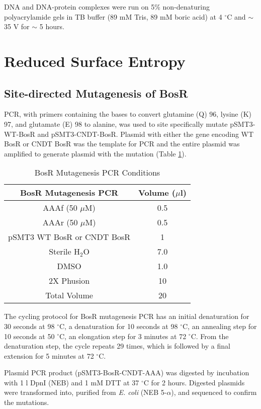 \documentclass[12pt,twoside]{reedthesis}
\begin{document}
DNA and DNA-protein complexes were run on 5\% non-denaturing polyacrylamide gels in TB buffer (89 mM Tris, 89 mM boric acid) at 4 $^\circ$C and $\sim$ 35 V for $\sim$ 5 hours. 

\section{Reduced Surface Entropy}

 \subsection{Site-directed Mutagenesis of BosR}
 PCR, with primers containing the bases to convert glutamine (Q) 96, lysine (K) 97, and glutamate (E) 98 to alanine, was used to site specifically mutate pSMT3-WT-BosR and pSMT3-CNDT-BosR. Plasmid with either the gene encoding WT BosR or CNDT BosR was the template for PCR and the entire plasmid was amplified to generate plasmid with the mutation (Table \ref{BosRmutpcr}). 
\begin{table}[H]
	\caption{BosR Mutagenesis PCR Conditions} 
	\centering
	\label{BosRmutpcr}
	\begin{tabular}{|c|c|}
		\hline
		BosR Mutagenesis PCR & Volume ($\mu$l)  \\
		\hline 
		AAAf (50 $\mu$M) & 0.5   \\ 
		AAAr (50 $\mu$M) & 0.5 \\  			
		pSMT3 WT BosR or CNDT BosR & 1   \\
		Sterile H$_{2}$O & 7.0   \\ 
		DMSO & 1.0 \\  
		2X Phusion & 10  \\     
		\hline   
		Total Volume & 20  \\
		\hline
	\end{tabular}
\end{table}

The cycling protocol for BosR mutagenesis PCR has an initial denaturation for 30 seconds at 98 $^{\circ}$C, a denaturation for 10 seconds at 98 $^{\circ}$C, an annealing step for 10 seconds at 50 $^{\circ}$C, an elongation step for 3 minutes at 72 $^{\circ}$C. From the denaturation step, the cycle repeats 29 times, which is followed by a final extension for 5 minutes at 72 $^{\circ}$C. 

Plasmid PCR product (pSMT3-BosR-CNDT-AAA) was digested by incubation  with 1 \micro l DpnI (NEB) and 1 mM DTT at 37 $^{\circ}$C for 2 hours. Digested plasmids were transformed into, purified from \textit{E. coli} (NEB 5-$\alpha$), and sequenced to confirm the mutations. 
\end{document}
